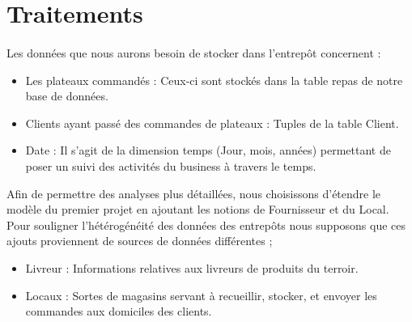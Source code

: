\section{Traitements}

\paragraph{} Les données que nous aurons besoin de stocker dans l’entrepôt concernent : 

\begin{itemize}
    \item Les plateaux commandés : Ceux-ci sont stockés dans la table repas de notre base de données.
    \item Clients ayant passé des commandes de plateaux : Tuples de la table Client.
    \item Date : Il s’agit de la dimension temps (Jour, mois, années) permettant de poser un suivi des activités du business à travers le temps.
\end{itemize}

\pargraph{} Afin de permettre des analyses plus détaillées, nous choisissons d’étendre le modèle du premier projet en ajoutant les notions de Fournisseur et du Local. Pour souligner l’hétérogénéité des données des entrepôts nous supposons que ces ajouts proviennent de sources de données différentes ;

\begin{itemize}
    \item Livreur : Informations relatives aux livreurs de produits du terroir.
    \item Locaux : Sortes de magasins servant à recueillir, stocker, et envoyer les commandes aux domiciles des clients.

\end{itemize}

